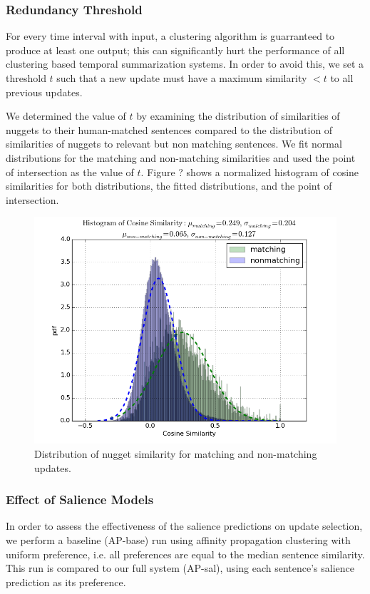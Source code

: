 \subsubsection{Redundancy Threshold}

For every time interval with input, a clustering algorithm is
guarranteed to produce at least one output; 
this can significantly hurt the performance of all clustering based 
temporal summarization systems. In order to avoid this, we set a threshold $t$
such that a new update must have a maximum similarity $< t$ to all previous 
updates.

We determined the value of $t$ by examining the distribution of similarities
of nuggets to their human-matched sentences compared to the distribution
of similarities of nuggets to relevant but non matching sentences. We fit
normal distributions for the matching and non-matching similarities and
used the point of intersection as the value of $t$.
Figure ? shows a normalized histogram of cosine similarities for both 
distributions, the fitted distributions, and the point of intersection.

\begin{figure}
\includegraphics[scale=.40]{match-dist.png} 
\caption{Distribution of nugget similarity for matching and non-matching 
updates.}
\end{figure}
\subsubsection{Effect of Salience Models}

In order to assess the effectiveness of the salience predictions on update
selection, we perform a baseline (AP-base) run using affinity propagation 
clustering
with uniform preference, i.e. all preferences are equal to the median sentence
similarity. This run is compared to our full system (AP-sal), using each
sentence's salience prediction as its preference. 

